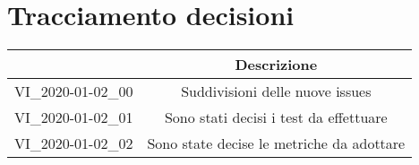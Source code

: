 \section{Tracciamento decisioni}
\renewcommand{\arraystretch}{1.8}

\begin{longtable}{|p{5cm}|c|}
	\hline
	
	\rowcolor{header}
	\centering{\textbf{Codice}} &  \textbf{Descrizione}\\
	
	\hline
	
	VI\_2020-01-02\_00 & Suddivisioni delle nuove issues  \\
	VI\_2020-01-02\_01 & Sono stati decisi i test da effettuare \\
	VI\_2020-01-02\_02 & Sono state decise le metriche da adottare \\
	
	\hline
\end{longtable}